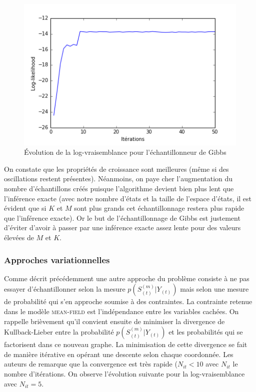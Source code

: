 \documentclass[10pt,a4paper]{article}
\newcommand{\meanfield}{\textsc{mean-field}}
\begin{document}
\begin{figure}[H]
\centering
\includegraphics[scale=0.5]{../resources/pictures/M3_K2_gibbs.png}
\caption{Évolution de la log-vraisemblance pour l'échantillonneur de Gibbs}
\end{figure}
On constate que les propriétés de croissance sont meilleures (même si des 
oscillations restent présentes). Néanmoins, on paye cher l'augmentation du 
nombre d'échantillons créés puisque l'algorithme devient bien plus lent que 
l'inférence exacte (avec notre nombre d'états et la taille de l'espace d'états, 
il est évident que si $K$ et $M$ sont plus grands cet échantillonnage restera 
plus rapide que l'inférence exacte). Or le but de l'échantillonnage de Gibbs 
est justement d'éviter d'avoir à passer par une inférence exacte assez lente 
pour des valeurs élevées de $M$ et $K$.
\subsubsection{Approches variationnelles}
Comme décrit précédemment une autre approche du problème consiste à ne pas 
essayer d'échantillonner selon la mesure $p(S_{(t)}^{(m)} \vert Y_{(t)})$ mais 
selon une mesure de probabilité qui s'en approche soumise à des contraintes. La 
contrainte retenue dans le modèle \meanfield{} est l'indépendance entre les 
variables cachées. On rappelle brièvement qu'il convient ensuite de minimiser 
la divergence de Kullback-Lieber entre la probabilité $p(S_{(t)}^{(m)} \vert 
Y_{(t)})$ et les probabilités qui se factorisent dans ce nouveau graphe. La 
minimisation de cette divergence se fait de manière itérative en opérant une 
descente selon chaque coordonnée. Les auteurs de \cite{ghahramani1997factorial} 
remarque que la convergence est très rapide ($N_{it}< 10$ avec $N_{it}$ le 
nombre d'itérations. On observe l'évolution suivante pour la log-vraisemblance 
avec $N_{it} = 5$.
\end{document}
